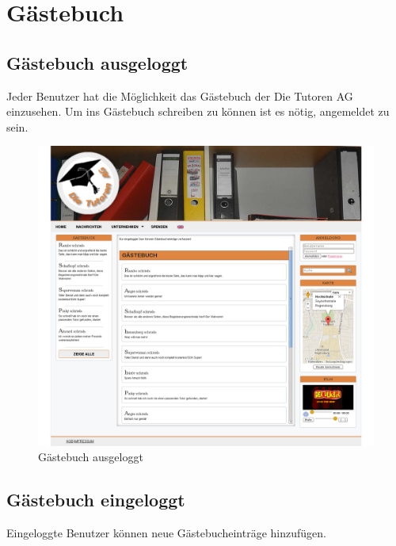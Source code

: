 
\section{Gästebuch}

\subsection{Gästebuch ausgeloggt}

Jeder Benutzer hat die Möglichkeit das Gästebuch der Die Tutoren AG einzusehen. \newline Um ins Gästebuch schreiben zu können ist es nötig, angemeldet zu sein.
\begin{figure}[!htbp]
\centering
\includegraphics[width=1\linewidth]{../Screenshots/de/Gaestebuch}
\caption{Gästebuch ausgeloggt}
\label{fig:Gaestebuch}
\end{figure}

\newpage
\subsection{Gästebuch eingeloggt}

Eingeloggte Benutzer können neue Gästebucheinträge hinzufügen.

